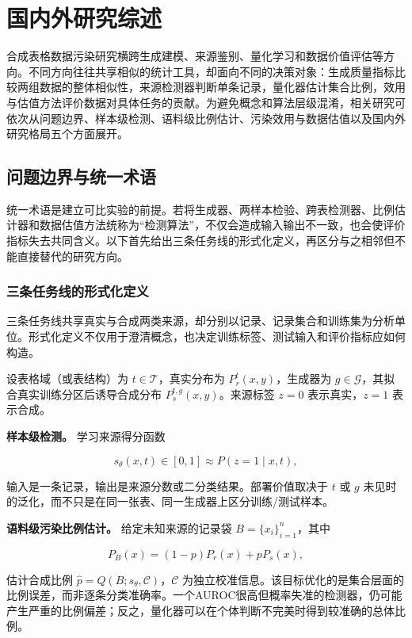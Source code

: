 \documentclass[
  chinese,
  12pt,
  a4paper,
  chinese,
  UTF8]{ctexart}
\begin{document}
\section{国内外研究综述}\label{ux56fdux5185ux5916ux7814ux7a76ux7efcux8ff0}

合成表格数据污染研究横跨生成建模、来源鉴别、量化学习和数据价值评估等方向。不同方向往往共享相似的统计工具，却面向不同的决策对象：生成质量指标比较两组数据的整体相似性，来源检测器判断单条记录，量化器估计集合比例，效用与估值方法评价数据对具体任务的贡献。为避免概念和算法层级混淆，相关研究可依次从问题边界、样本级检测、语料级比例估计、污染效用与数据估值以及国内外研究格局五个方面展开。

\subsection{问题边界与统一术语}\label{ux95eeux9898ux8fb9ux754cux4e0eux7edfux4e00ux672fux8bed}

统一术语是建立可比实验的前提。若将生成器、两样本检验、跨表检测器、比例估计器和数据估值方法统称为``检测算法''，不仅会造成输入输出不一致，也会使评价指标失去共同含义。以下首先给出三条任务线的形式化定义，再区分与之相邻但不能直接替代的研究方向。

\subsubsection{三条任务线的形式化定义}\label{ux4e09ux6761ux4efbux52a1ux7ebfux7684ux5f62ux5f0fux5316ux5b9aux4e49}

三条任务线共享真实与合成两类来源，却分别以记录、记录集合和训练集为分析单位。形式化定义不仅用于澄清概念，也决定训练标签、测试输入和评价指标应如何构造。

设表格域（或表结构）为 \(t\in\mathcal{T}\)，真实分布为
\(P_{r}^{t}(x,y)\)，生成器为
\(g\in\mathcal{G}\)，其拟合真实训练分区后诱导合成分布
\(P_{s}^{t,g}(x,y)\)。来源标签 \(z=0\) 表示真实，\(z=1\) 表示合成。

\textbf{样本级检测。} 学习来源得分函数

\[s_\theta(x,t)\in[0,1]\approx P(z=1\mid x,t),\]

输入是一条记录，输出是来源分数或二分类结果。部署价值取决于 \(t\) 或
\(g\) 未见时的泛化，而不只是在同一张表、同一生成器上区分训练/测试样本。

\textbf{语料级污染比例估计。} 给定未知来源的记录袋
\(B=\{x_i\}_{i=1}^n\)，其中

\[P_B(x)=(1-p)P_r(x)+pP_s(x),\]

估计合成比例 \(\hat p=Q(B;s_\theta,\mathcal C)\)，\(\mathcal C\)
为独立校准信息。该目标优化的是集合层面的比例误差，而非逐条分类准确率。一个AUROC很高但概率失准的检测器，仍可能产生严重的比例偏差；反之，量化器可以在个体判断不完美时得到较准确的总体比例。
\end{document}
